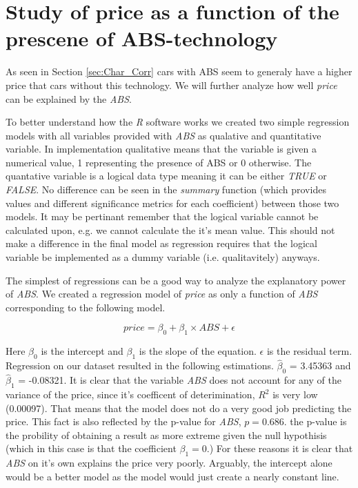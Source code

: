 \section{Study of price as a function of the prescene of ABS-technology} %
\label{sec:price_abs}

As seen in Section \ref{sec:Char_Corr} cars with ABS seem to generaly have a higher price that cars without this technology. We will further analyze how well \textit{price} can be explained by the \textit{ABS}.

\noindent
To better understand how the \textit{R} software works we created two simple regression models with all variables provided with \textit{ABS} as qualative and quantitative variable. In implementation qualitative means that the variable is given a numerical value, 1 representing the presence of ABS or 0 otherwise. The quantative variable is a logical data type meaning it can be either \textit{TRUE} or \textit{FALSE}. No difference can be seen in the \textit{summary} function (which provides values and different significance metrics for each coefficient) between those two models. It may be pertinant remember that the logical variable cannot be calculated upon, e.g. we cannot calculate the it's mean value. This should not make a difference in the final model as regression requires that the logical variable be implemented as a dummy variable (i.e. qualitavitely) anyways.

\noindent
The simplest of regressions can be a good way to analyze the explanatory power of \textit{ABS}. We created a regression model of \textit{price} as only a function of \textit{ABS} corresponding to the following model.

\begin{equation}
	price = \beta_0 + \beta_1 \times ABS + \epsilon
\end{equation}

\noindent
Here $\beta_0$ is the intercept and $\beta_1$ is the slope of the equation. $\epsilon$ is the residual term. Regression on our dataset resulted in the following estimations. $\hat{\beta}_0$ = 3.45363 and $\hat{\beta}_1$ = -0.08321. It is clear that the variable \textit{ABS} does not account for any of the variance of the price, since it's coefficent of deterimination, $R^2$ is very low (0.00097). That means that the model does not do a very good job predicting the price. This fact is also reflected by the p-value for \textit{ABS}, $p=0.686$. the p-value is the probility of obtaining a result as more extreme given the null hypothisis (which in this case is that the coefficient $\beta_1 = 0$.) For these reasons it is clear that \textit{ABS} on it's own explains the price very poorly. Arguably, the intercept alone would be a better model as the model
would just create a nearly constant line.

